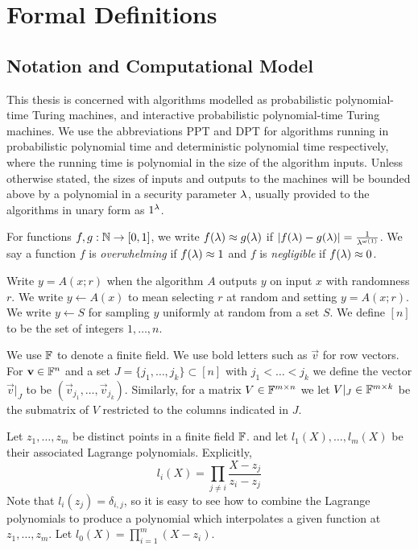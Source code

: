 \chapter{Formal Definitions}
\label{chapterlabel:Definitions}

\section{Notation and Computational Model}

This thesis is concerned with algorithms modelled as probabilistic polynomial-time Turing machines, and interactive probabilistic polynomial-time Turing machines. We use the abbreviations PPT and DPT for algorithms running in probabilistic polynomial time and deterministic polynomial time respectively, where the running time is polynomial in the size of the algorithm inputs. Unless otherwise stated, the sizes of inputs and outputs to the machines will be bounded above by a polynomial in a security parameter $\lambda$, usually provided to the algorithms in unary form as $1^{\lambda}$.

For functions $f,g: \mathbb{N} \rightarrow [0,1] $, we write $f(\lambda)\approx g(\lambda) $ if 
$|f(\lambda) - g(\lambda)|= \frac{1}{\lambda^{\omega(1)}}$. We say a function $f$ is \emph{overwhelming} if 
$f(\lambda) \approx 1$ and $f$ is \emph{negligible} if $f(\lambda) \approx 0$.

Write $y=A(x;r)$ when the algorithm $A$ outputs $y$ on input $x$ with randomness $r$. We write $y \gets A(x)$ to mean selecting $r$ at random and setting $y=A(x;r)$. We write $y \gets S$ for sampling $y$ uniformly at random from a set $S$. We define $[n]$ to be the set of integers $1,\ldots,n$.

We use $\mathbb{F}$ to denote a finite field. We use bold letters such as $\vec{v}$ for row vectors. For $\mathbf{v}\in \mathbb{F}^n$ and a set $J=\{j_1,\dots, j_k\}\subset [n]$ with $j_1<\dots<j_k$ we define the vector $\vec{v}|_J$ to be $(\vec{v}_{j_1},\dots, \vec{v}_{j_k})$. Similarly, for a matrix $V\in \mathbb{F}^{m\times n}$ we let $V|_{J}\in \mathbb{F}^{m\times k}$ be the submatrix of $V$ restricted to the columns indicated in $J$.

Let $z_1,\ldots,z_m$ be distinct points in a finite field $\mathbb{F}$. and let $l_1(X),\ldots,l_m(X)$ be their associated Lagrange polynomials. Explicitly, $$l_i(X) = \prod_{j \neq i} \frac{X-z_j}{z_i - z_j}$$ Note that $l_i(z_j)=\delta_{i,j}$, so it is easy to see how to combine the Lagrange polynomials to produce a polynomial which interpolates a given function at $z_1, \ldots, z_m$. Let $l_0(X) = \prod_{i=1}^m (X-z_i)$. 

